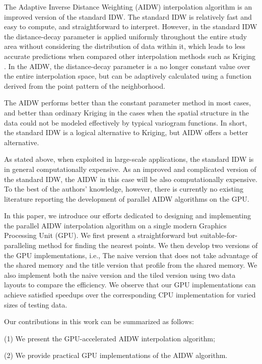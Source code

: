\documentclass[fleqn,11pt]{wlscirep}
\begin{document}
The Adaptive Inverse Distance Weighting (AIDW) interpolation algorithm \cite{32} is an improved version of the standard IDW. The standard IDW is relatively fast and easy to compute, and straightforward to 
interpret. However, in the standard IDW the distance-decay parameter is 
applied uniformly throughout the entire study area without considering the 
distribution of data within it, which leads to less accurate predictions 
when compared other interpolation methods such as Kriging \cite{32}. In the AIDW, the distance-decay parameter is a no longer 
constant value over the entire interpolation space, but can be adaptively 
calculated using a function derived from the point pattern of the 
neighborhood.


The AIDW performs better than the constant parameter method in most cases, 
and better than ordinary Kriging in the cases when the spatial structure in 
the data could not be modeled effectively by typical variogram functions. In 
short, the standard IDW is a logical alternative to Kriging, but AIDW offers 
a better alternative. 

As stated above, when exploited in large-scale applications, the standard 
IDW is in general computationally expensive. As an improved and complicated 
version of the standard IDW, the AIDW in this case will be also 
computationally expensive. To the best of the authors' knowledge, however, 
there is currently no existing literature reporting the development of 
parallel AIDW algorithms on the GPU.

In this paper, we introduce our efforts dedicated to designing and 
implementing the parallel AIDW interpolation algorithm \cite{32} on 
a single modern Graphics Processing Unit (GPU). We first present a 
straightforward but suitable-for-paralleling method for finding the nearest 
points. We then develop two versions of the GPU implementations, i.e., The 
naive version that does not take advantage of the shared memory and the 
title version that profile from the shared memory. We also implement both 
the naive version and the tiled version using two data layouts to compare 
the efficiency. We observe that our GPU implementations can achieve 
satisfied speedups over the corresponding CPU implementation for varied 
sizes of testing data.

Our contributions in this work can be summarized as follows:

(1) We present the GPU-accelerated AIDW interpolation algorithm;

(2) We provide practical GPU implementations of the AIDW algorithm.
\end{document}
